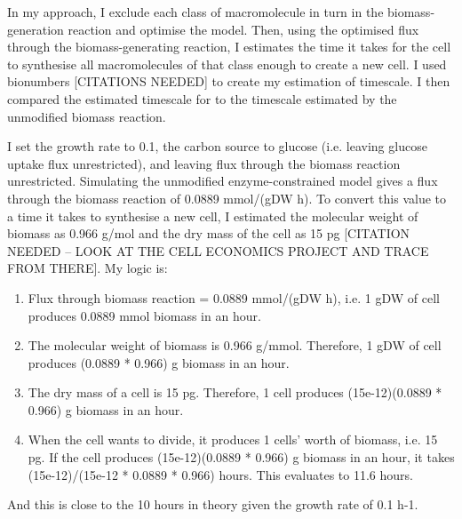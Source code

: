 In my approach, I exclude each class of macromolecule in turn in the biomass-generation reaction and optimise the model.
Then, using the optimised flux through the biomass-generating reaction, I estimates the time it takes for the cell to synthesise all macromolecules of that class enough to create a new cell.
I used bionumbers [CITATIONS NEEDED] to create my estimation of timescale.
I then compared the estimated timescale for to the timescale estimated by the unmodified biomass reaction.

I set the growth rate to 0.1, the carbon source to glucose (i.e. leaving glucose uptake flux unrestricted), and leaving flux through the biomass reaction unrestricted.
Simulating the unmodified enzyme-constrained model gives a flux through the biomass reaction of 0.0889 mmol/(gDW h).
To convert this value to a time it takes to synthesise a new cell, I estimated the molecular weight of biomass as 0.966 g/mol \parencite{takhaveevTemporalSegregationBiosynthetic2023} and the dry mass of the cell as 15 pg [CITATION NEEDED -- LOOK AT THE CELL ECONOMICS PROJECT AND TRACE FROM THERE].
My logic is:
\begin{enumerate}
   \item Flux through biomass reaction = 0.0889 mmol/(gDW h), i.e. 1 gDW of cell produces 0.0889 mmol biomass in an hour.
   \item The molecular weight of biomass is 0.966 g/mmol.  Therefore, 1 gDW of cell produces (0.0889 * 0.966) g biomass in an hour.
   \item The dry mass of a cell is 15 pg.  Therefore, 1 cell produces (15e-12)(0.0889 * 0.966) g biomass in an hour.
   \item When the cell wants to divide, it produces 1 cells' worth of biomass, i.e. 15 pg.  If the cell produces (15e-12)(0.0889 * 0.966) g biomass in an hour, it takes (15e-12)/(15e-12 * 0.0889 * 0.966) hours.  This evaluates to 11.6 hours.
\end{enumerate}
And this is close to the 10 hours in theory given the growth rate of 0.1 h-1.

